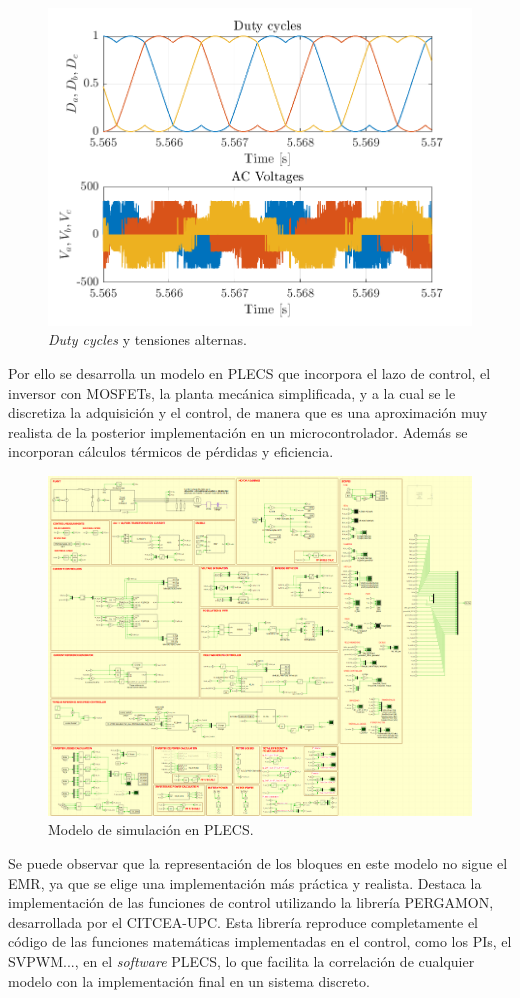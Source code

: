 \begin{figure}[H]
    \centering
    \includegraphics[width=0.85\linewidth]{fig/abc_plot.png}
    \caption{\textit{Duty cycles} y tensiones alternas.}
    
\end{figure}


Por ello se desarrolla un modelo en PLECS que incorpora el lazo de control, el inversor con MOSFETs, la planta mecánica simplificada, y a la cual se le discretiza la adquisición y el control, de manera que es una aproximación muy realista de la posterior implementación en un microcontrolador. Además se incorporan cálculos térmicos de pérdidas y eficiencia.

\begin{figure}[H]
	\centering
	\includegraphics[width=0.7\linewidth]{fig/PLECS_overall}
	\caption{Modelo de simulación en PLECS.}
\end{figure}


Se puede observar que la representación de los bloques en este modelo no sigue el EMR, ya que se elige una implementación más práctica y realista. Destaca la implementación de las funciones de control utilizando la librería PERGAMON, desarrollada por el CITCEA-UPC. Esta librería reproduce completamente el código de las funciones matemáticas implementadas en el control, como los PIs, el SVPWM..., en el \textit{software} PLECS, lo que facilita la correlación de cualquier modelo con la implementación final en un sistema discreto.


